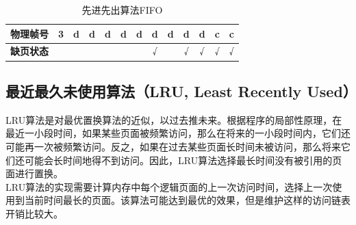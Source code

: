 \begin{table}[H]
\begin{tabular}{|clc|c|c|c|c|c|c|c|c|c|c|c|}
        \multicolumn{2}{|c|}{\multirow{-4}{*}{\textbf{物理帧号}}} & \textbf{3} & d          & {\color[HTML]{333333} d} & {\color[HTML]{333333} d} & {\color[HTML]{FE0000} d} & {\color[HTML]{333333} d} & {\color[HTML]{333333} d} & {\color[HTML]{333333} d} & {\color[HTML]{333333} d} & {\color[HTML]{333333} d} & {\color[HTML]{FE0000} c} & c                        \\ \hline
        \multicolumn{2}{|c|}{\textbf{缺页状态}}                   &            &            &                          &                          &                          &                          & √                        &                          & √                        & √                        & √                        & √                        \\ \hline
    \end{tabular}
    \caption{先进先出算法FIFO}
\end{table}

\vspace{0.5cm}

\subsection{最近最久未使用算法（LRU, Least Recently Used）}

LRU算法是对最优置换算法的近似，以过去推未来。根据程序的局部性原理，在最近一小段时间，如果某些页面被频繁访问，那么在将来的一小段时间内，它们还可能再一次被频繁访问。反之，如果在过去某些页面长时间未被访问，那么将来它们还可能会长时间地得不到访问。因此，LRU算法选择最长时间没有被引用的页面进行置换。\\

LRU算法的实现需要计算内存中每个逻辑页面的上一次访问时间，选择上一次使用到当前时间最长的页面。该算法可能达到最优的效果，但是维护这样的访问链表开销比较大。

